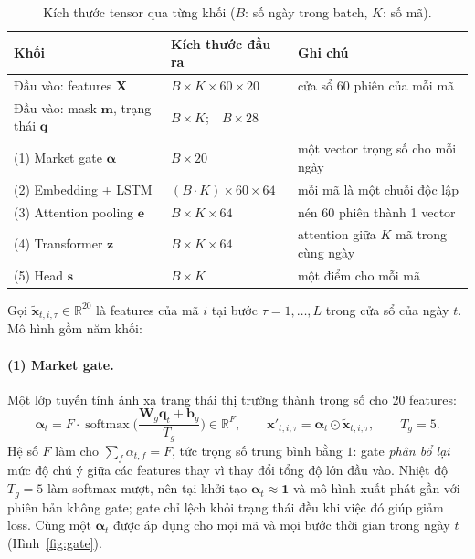 \documentclass[a4paper,12pt]{article}
\DeclareMathOperator{\softmax}{softmax}
\begin{document}
\begin{table}[H]\centering\small
\caption{Kích thước tensor qua từng khối ($B$: số ngày trong batch, $K$: số mã).}
\label{tab:shapes}
\renewcommand{\arraystretch}{1.2}
\begin{tabularx}{\textwidth}{@{}>{\raggedright\arraybackslash}p{4.6cm}>{\raggedright\arraybackslash}p{4.2cm}X@{}}
\toprule
\textbf{Khối} & \textbf{Kích thước đầu ra} & \textbf{Ghi chú}\\\midrule
Đầu vào: features $\mathbf X$ & $B\times K\times60\times20$ & cửa sổ 60 phiên của mỗi mã\\
Đầu vào: mask $\mathbf m$, trạng thái $\mathbf q$ & $B\times K$;\ \ $B\times28$ & \\
(1) Market gate $\bm\alpha$ & $B\times20$ & một vector trọng số cho mỗi ngày\\
(2) Embedding + LSTM & $(B\cdot K)\times60\times64$ & mỗi mã là một chuỗi độc lập\\
(3) Attention pooling $\mathbf e$ & $B\times K\times64$ & nén 60 phiên thành 1 vector\\
(4) Transformer $\mathbf z$ & $B\times K\times64$ & attention giữa $K$ mã trong cùng ngày\\
(5) Head $\mathbf s$ & $B\times K$ & một điểm cho mỗi mã\\
\bottomrule
\end{tabularx}
\end{table}

Gọi $\tilde{\mathbf{x}}_{t,i,\tau}\in\mathbb{R}^{20}$ là features của mã $i$ tại bước $\tau=1,\dots,L$ trong cửa sổ của ngày $t$. Mô hình gồm năm khối:

\paragraph{(1) Market gate.} Một lớp tuyến tính ánh xạ trạng thái thị trường thành trọng số cho 20 features:
\begin{equation}
    \bm\alpha_t = F\cdot\softmax\!\Big(\frac{\mathbf{W}_g\mathbf{q}_t+\mathbf{b}_g}{T_g}\Big)\in\mathbb{R}^{F},\qquad
    \mathbf{x}'_{t,i,\tau}=\bm\alpha_t\odot\tilde{\mathbf{x}}_{t,i,\tau},\qquad T_g=5 .
\end{equation}
Hệ số $F$ làm cho $\sum_f\alpha_{t,f}=F$, tức trọng số trung bình bằng $1$: gate \emph{phân bổ lại} mức độ chú ý giữa các features thay vì thay đổi tổng độ lớn đầu vào. Nhiệt độ $T_g=5$ làm softmax mượt, nên tại khởi tạo $\bm\alpha_t\approx\mathbf{1}$ và mô hình xuất phát gần với phiên bản không gate; gate chỉ lệch khỏi trạng thái đều khi việc đó giúp giảm loss. Cùng một $\bm\alpha_t$ được áp dụng cho mọi mã và mọi bước thời gian trong ngày $t$ (Hình~\ref{fig:gate}).
\end{document}
